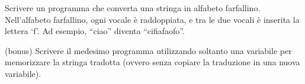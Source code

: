 \begin{Exercise}[label={ex:farfallino}]
  \Question Scrivere un programma che converta una stringa in alfabeto farfallino. Nell'alfabeto farfallino, ogni vocale \`e raddoppiata, e tra le due vocali \`e inserita la lettera `f'. Ad esempio, ``ciao'' diventa ``cifiafaofo''.

  \Question (bonus) Scrivere il medesimo programma utilizzando soltanto una variabile per memorizzare la stringa tradotta (ovvero senza copiare la traduzione in una nuova variabile).
\end{Exercise}

\begin{Answer}[ref={ex:farfallino}]
  \Question
  

  \Question
  
\end{Answer}